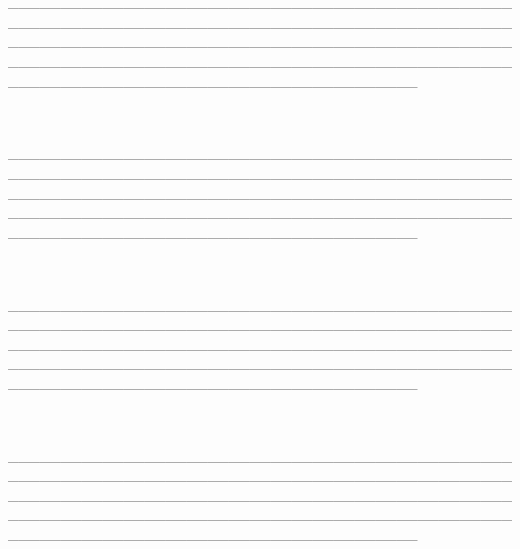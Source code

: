 \textbf{\textcolor{ctmmBlue}{\1}}\\
📝 \_\_\_\_\_\_\_\_\_\_\_\_\_\_\_\_\_\_\_\_\_\_\_\_\_\_\_\_\_\_\_\_\_\_\_\_\_\_\_\_\_\_\_\_\_\_\_\_\_\_\_\_\_\_\_\_\_\_\_\_\_\_\_\_\_\_\_\_\_\_\_\_\_\_\_\_\_\_\_\_\_\_\_\_\_\_\_\_\_\_\_\_\_\_\_\_\_\_\_\_\_\_\_\_\_\_\_\_\_\_\_\_\_\_\_\_\_\_\_\_\_\_\_\_\_\_\_\_\_\_\_\_\_\_\_\_\_\_\_\_\_\_\_\_\_\_\_\_\_\_\_\_\_\_\_\_\_\_\_\_\_\_\_\_\_\_\_\_\_\_\_\_\_\_\_\_\_\_\_\_\_\_\_\_\_\_\_\_\_\_\_\_\_\_\_\_\_\_\_\_\_\_\_\_\_\_\_\_\_\_\_\_\_\_\_\_\_\_\_\_\_\_\_\_\_\_\_\_\_\_\_

\hfill\break
\hfill\break

\textbf{\textcolor{ctmmBlue}{\1}}\\
📝 \_\_\_\_\_\_\_\_\_\_\_\_\_\_\_\_\_\_\_\_\_\_\_\_\_\_\_\_\_\_\_\_\_\_\_\_\_\_\_\_\_\_\_\_\_\_\_\_\_\_\_\_\_\_\_\_\_\_\_\_\_\_\_\_\_\_\_\_\_\_\_\_\_\_\_\_\_\_\_\_\_\_\_\_\_\_\_\_\_\_\_\_\_\_\_\_\_\_\_\_\_\_\_\_\_\_\_\_\_\_\_\_\_\_\_\_\_\_\_\_\_\_\_\_\_\_\_\_\_\_\_\_\_\_\_\_\_\_\_\_\_\_\_\_\_\_\_\_\_\_\_\_\_\_\_\_\_\_\_\_\_\_\_\_\_\_\_\_\_\_\_\_\_\_\_\_\_\_\_\_\_\_\_\_\_\_\_\_\_\_\_\_\_\_\_\_\_\_\_\_\_\_\_\_\_\_\_\_\_\_\_\_\_\_\_\_\_\_\_\_\_\_\_\_\_\_\_\_\_\_\_

\hfill\break
\hfill\break

\textbf{\textcolor{ctmmBlue}{\1}}\\
📝 \_\_\_\_\_\_\_\_\_\_\_\_\_\_\_\_\_\_\_\_\_\_\_\_\_\_\_\_\_\_\_\_\_\_\_\_\_\_\_\_\_\_\_\_\_\_\_\_\_\_\_\_\_\_\_\_\_\_\_\_\_\_\_\_\_\_\_\_\_\_\_\_\_\_\_\_\_\_\_\_\_\_\_\_\_\_\_\_\_\_\_\_\_\_\_\_\_\_\_\_\_\_\_\_\_\_\_\_\_\_\_\_\_\_\_\_\_\_\_\_\_\_\_\_\_\_\_\_\_\_\_\_\_\_\_\_\_\_\_\_\_\_\_\_\_\_\_\_\_\_\_\_\_\_\_\_\_\_\_\_\_\_\_\_\_\_\_\_\_\_\_\_\_\_\_\_\_\_\_\_\_\_\_\_\_\_\_\_\_\_\_\_\_\_\_\_\_\_\_\_\_\_\_\_\_\_\_\_\_\_\_\_\_\_\_\_\_\_\_\_\_\_\_\_\_\_\_\_\_\_\_

\hfill\break
\hfill\break

\hfill\break
\hfill\break

\textbf{\textcolor{ctmmBlue}{\1}}\\
📝 \_\_\_\_\_\_\_\_\_\_\_\_\_\_\_\_\_\_\_\_\_\_\_\_\_\_\_\_\_\_\_\_\_\_\_\_\_\_\_\_\_\_\_\_\_\_\_\_\_\_\_\_\_\_\_\_\_\_\_\_\_\_\_\_\_\_\_\_\_\_\_\_\_\_\_\_\_\_\_\_\_\_\_\_\_\_\_\_\_\_\_\_\_\_\_\_\_\_\_\_\_\_\_\_\_\_\_\_\_\_\_\_\_\_\_\_\_\_\_\_\_\_\_\_\_\_\_\_\_\_\_\_\_\_\_\_\_\_\_\_\_\_\_\_\_\_\_\_\_\_\_\_\_\_\_\_\_\_\_\_\_\_\_\_\_\_\_\_\_\_\_\_\_\_\_\_\_\_\_\_\_\_\_\_\_\_\_\_\_\_\_\_\_\_\_\_\_\_\_\_\_\_\_\_\_\_\_\_\_\_\_\_\_\_\_\_\_\_\_\_\_\_\_\_\_\_\_\_\_\_\_

\hfill\break
\hfill\break

